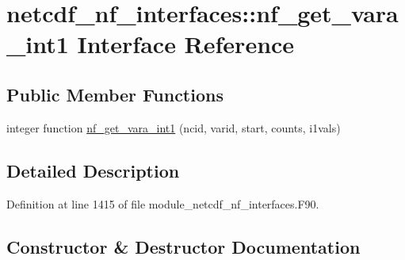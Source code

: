 \hypertarget{interfacenetcdf__nf__interfaces_1_1nf__get__vara__int1}{}\section{netcdf\+\_\+nf\+\_\+interfaces\+:\+:nf\+\_\+get\+\_\+vara\+\_\+int1 Interface Reference}
\label{interfacenetcdf__nf__interfaces_1_1nf__get__vara__int1}
\subsection*{Public Member Functions}
\begin{DoxyCompactItemize}
\item 
integer function \hyperlink{interfacenetcdf__nf__interfaces_1_1nf__get__vara__int1_a86ebab547d03d17f3f18f3495dfa4b50}{nf\+\_\+get\+\_\+vara\+\_\+int1} (ncid, varid, start, counts, i1vals)
\end{DoxyCompactItemize}


\subsection{Detailed Description}


Definition at line 1415 of file module\+\_\+netcdf\+\_\+nf\+\_\+interfaces.\+F90.



\subsection{Constructor \& Destructor Documentation}
\mbox{\label{interfacenetcdf__nf__interfaces_1_1nf__get__vara__int1_a86ebab547d03d17f3f18f3495dfa4b50}} 
